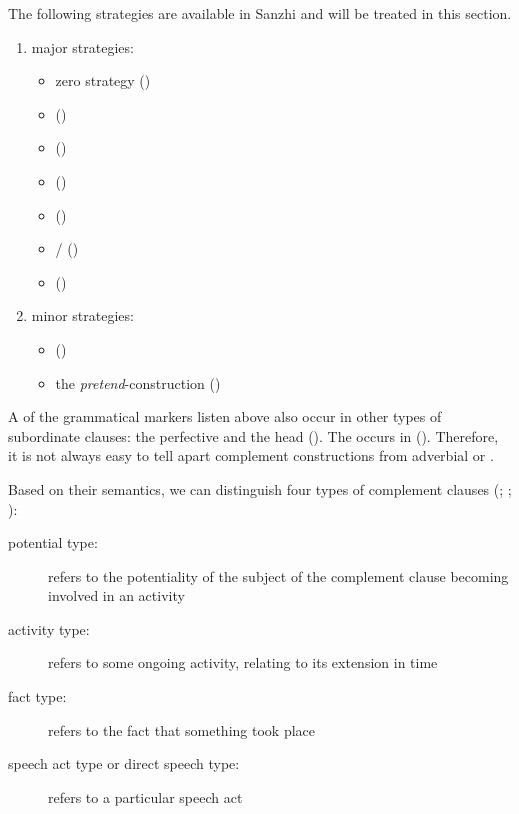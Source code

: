 The following  strategies are available in Sanzhi and will be treated in this section.
%
\begin{enumerate}
	\item	major  strategies:
	\begin{itemize}
		\item	zero strategy ()
		\item	{}   ()
		\item	{}  ()
		\item	{}  ()
		\item	{}  ()
		\item	{} \slash {} ()
		\item	{}  ()
	\end{itemize}

	\item	minor  strategies:
	\begin{itemize}
		\item	{}  ()
		\item the \textit{pretend}-construction ()
	\end{itemize}
\end{enumerate}

A  of the grammatical markers listen above also occur in other types of subordinate clauses: the perfective and the  head  (). The   occurs in  (). Therefore, it is not always easy to tell apart complement constructions from adverbial or .

Based on their semantics, we can distinguish four types of complement clauses (\citealp[130]{Hengeveld1989}; \citealp[93]{Dik1997}; \citealp{Dixon2006}):
%
\begin{description}
	\item[potential type:]  refers to the potentiality of the subject of the complement clause becoming involved in an activity
	\item[activity type:] refers to some ongoing activity, relating to its extension in time
	\item[fact type:] refers to the fact that something took place
	\item[speech act type or direct speech type:] refers to a particular speech act
\end{description}

